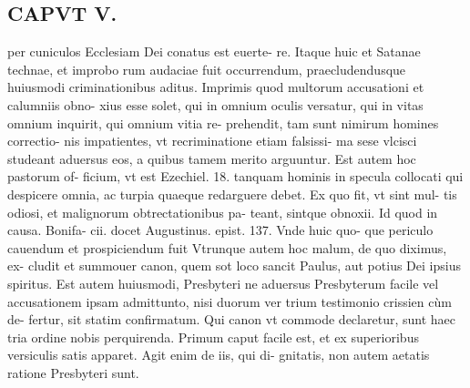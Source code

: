 \documentclass{article}
\begin{document}
\begin{pages}
\section*{CAPVT  V. }
\marginpar{[ p.333 ]}\pstart per cuniculos Ecclesiam Dei conatus est euerte- re. Itaque huic et Satanae technae, et improbo rum audaciae fuit occurrendum, praecludendusque  huiusmodi criminationibus aditus. Imprimis quod multorum accusationi et calumniis obno- xius esse solet, qui in omnium oculis versatur, qui in vitas omnium inquirit, qui omnium vitia re- prehendit, tam sunt nimirum homines correctio- nis impatientes, vt recriminatione etiam falsissi- ma sese vlcisci studeant aduersus eos, a quibus tamem merito arguuntur. Est autem hoc pastorum of- ficium, vt est Ezechiel. 18. tanquam hominis in specula collocati qui despicere omnia, ac turpia quaeque  redarguere debet. Ex quo fit, vt sint mul- tis odiosi, et malignorum obtrectationibus pa- teant, sintque obnoxii. Id quod in causa. Bonifa- cii. docet Augustinus. epist. 137. Vnde huic quo- que periculo cauendum et prospiciendum fuit Vtrunque  autem hoc malum, de quo diximus, ex- cludit et summouer canon, quem sot loco sancit Paulus, aut potius Dei ipsius spiritus. Est autem huiusmodi, Presbyteri ne aduersus Presbyterum facile vel accusationem ipsam admittunto, nisi duorum ver trium testimonio crissien cùm de- fertur, sit statim confirmatum.  \pend\pstart Qui canon vt commode declaretur, sunt haec tria ordine nobis perquirenda.  \pend\pstart Primum caput facile est, et ex superioribus versiculis satis apparet. Agit enim de iis, qui di- gnitatis, non autem aetatis ratione Presbyteri sunt.  \pend

\end{pages}
\end{document}
